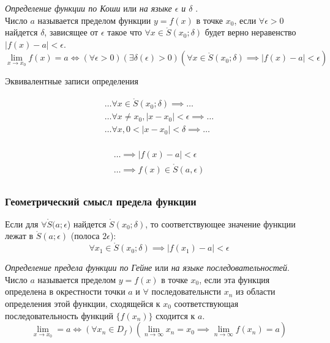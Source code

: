 \begin{definition}
  \textit{Определение функции по Коши} или \textit{на языке $\epsilon$ и $\delta$ }. \\
  Число $a$ называется пределом функции $y = f\left( x \right) $ в точке $x_0$, если $\forall \epsilon > 0$ найдется $\delta$, зависящее от  $\epsilon$ такое что $\forall x \in \mathring{S}(x_0; \delta)$ будет верно неравенство $|f\left( x \right) - a| < \epsilon$.
  \[
    \lim_{x \to x_0} f(x) = a \iff (\forall \epsilon > 0)(\exists  \delta(\epsilon) > 0)(\forall  x \in \mathring{S}(x_0; \delta) \implies |f(x) - a| < \epsilon)
  \]

  Эквивалентные записи определения

  \begin{gather*}
    \ldots \forall x \in \mathring{S}(x_0; \delta) \implies \ldots \\
    \ldots \forall x \neq x_0, |x - x_0| < \epsilon \implies \ldots \\
    \ldots \forall x, 0 < |x - x_0| < \delta \implies \ldots \\
  \end{gather*}
  
  \begin{gather*}
    \ldots \implies |f(x) - a| < \epsilon \\
    \ldots \implies f(x) \in \mathring{S}(a, \epsilon) \\
  \end{gather*}
\end{definition}

\subsubsection*{Геометрический смысл предела функции}


Если для $\forall \mathring{S}(a; \epsilon$) найдется $\mathring{S}(x_0; \delta)$, то соответствующее значение функции лежат в  $\mathring{S}(a; \epsilon)$ (полоса $2 \epsilon$):
\[
  \forall x_1 \in \mathring{S}(x_0; \delta) \implies |f(x_1) - a| < \epsilon
\] 
\begin{definition}
  \textit{Определение предела функции по Гейне} или \textit{на языке последовательностей}. \\
  Число $a$ называется пределом $y = f\left( x \right) $ в точке $x_0$, если эта функция определена в окрестности точки $a$ и $\forall$ последовательнсти $x_{n}$ из области определения этой функции, сходящейся к $x_0$ соответствующая последовательность функций $\{f(x_{n})\}$ сходится к $a$.
  \[
  \lim_{x \to x_0} = a \iff (\forall x_{n}\in D_f)(\lim_{n \to \infty} x_{n} = x_0 \implies \lim_{n \to \infty} f(x_{n}) = a) 
  \] 
\end{definition}


